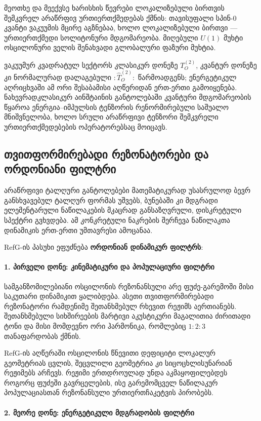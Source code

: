 \documentclass[11pt,a4paper]{article}
\begin{document}
მეოთხე და მეექვსე ხარისხის წევრები ლოკალიზებული ბირთვის შემკვრელ არაწრფივ ურთიერთქმედებას ქმნის: თავისუფალი სპინ-$0$ კვანტი ვაკუუმის მცირე აგზნებაა, ხოლო ლოკალიზებული ბირთვი — ურთიერთქმედი სოლიტონური მდგომარეობა. მიღებული $U(1)$ მუხტი ოსცილონური ველის შენახვადი გლობალური ფაზური მუხტია.

ვაკუუმურ კვადრატულ სექტორს კლასიკურ დონეზე $T_O^{(2)}$, კვანტურ დონეზე კი ნორმალურად დალაგებული $:\widehat T_O^{(2)}:$ წარმოადგენს; ენერგეტიკულ აღრიცხვაში ამ ორი შესაბამისი აღწერიდან ერთ-ერთი გამოიყენება. ნახევრადკლასიკურ აინშტაინის განტოლებაში კვანტური მდგომარეობის წყაროა ენერგია–იმპულსის ტენზორის რენორმირებული საშუალო მნიშვნელობა, ხოლო სრული არაწრფივი ტენზორი შემკვრელი ურთიერთქმედებების ოპერატორებსაც მოიცავს.


\subsection{თვითფორმირებადი რეზონატორები და ორდონიანი ფილტრი}

არაწრფივი ტალღური განტოლებები მათემატიკურად უსასრულოდ ბევრ განსხვავებულ ტალღურ ფორმას უშვებს, ბუნებაში კი მდგრადი ელემენტარული ნაწილაკების მკაცრად განსაზღვრული, დისკრეტული სპექტრი გვხვდება. ამ კონკრეტული ნაკრების შერჩევა ნაწილაკთა დინამიკის ერთ-ერთი უმთავრესი ამოცანაა.

RefG-ის პასუხი ეფუძნება \textbf{ორდონიან დინამიკურ ფილტრს}:

\paragraph{1. პირველი დონე: კინემატიკური და პოპულაციური ფილტრი}

სამგანზომილებიანი ოსცილონის რეზონანსული არე ფუძე-გარემოში მისი საკუთარი დინამიკით ყალიბდება. ასეთი თვითფორმირებადი რეზონატორი რამდენიმე შეთანხმებულ რხევით რეჟიმს აერთიანებს. შეთანხმებული სიხშირეების მარტივი აკუსტიკური მაგალითია ძირითადი ტონი და მისი მომდევნო ორი ჰარმონიკა, რომლებიც $1:2:3$ თანაფარდობას ქმნის.

RefG-ის აღწერაში ოსცილონის წნევითი დეფიციტი ლოკალურ გეომეტრიას ცვლის, შეცვლილი გეომეტრია კი სიცოცხლისუნარიან რეჟიმებს არჩევს. რეჟიმი ერთდროულად უნდა აკმაყოფილებდეს როგორც ფუძეში გავრცელების, ისე გარემომცველ ნაწილაკურ პოპულაციასთან რეზონანსული ურთიერთჩაკეტვის პირობებს.

\paragraph{2. მეორე დონე: ენერგეტიკული მდგრადობის ფილტრი}
\end{document}
